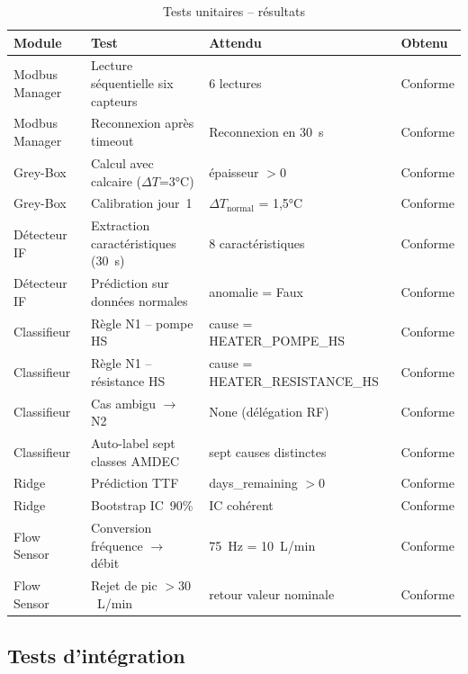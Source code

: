 \begin{table}[htbp]
\centering
\renewcommand{\arraystretch}{1.45}
\caption{Tests unitaires -- résultats}
\label{tab:tests_unitaires}
\begin{tabular}{|p{}|p{}|p{}|p{}|}
\hline
\rowcolor{gray!25}
\textbf{Module} & \textbf{Test} & \textbf{Attendu} & \textbf{Obtenu} \\
\hline
Modbus Manager & Lecture séquentielle six capteurs & 6 lectures & Conforme \\
\hline
Modbus Manager & Reconnexion après timeout & Reconnexion en 30~s & Conforme \\
\hline
Grey-Box & Calcul avec calcaire (\(\Delta T\)=3°C) & épaisseur \(> 0\) & Conforme \\
\hline
Grey-Box & Calibration jour~1 & \(\Delta T_{\text{normal}}\) = 1,5°C & Conforme \\
\hline
Détecteur IF & Extraction caractéristiques (30~s) & 8 caractéristiques & Conforme \\
\hline
Détecteur IF & Prédiction sur données normales & anomalie = Faux & Conforme \\
\hline
Classifieur & Règle N1 -- pompe HS & cause = HEATER\_\allowbreak POMPE\_\allowbreak HS & Conforme \\
\hline
Classifieur & Règle N1 -- résistance HS & cause = HEATER\_\allowbreak RESISTANCE\_\allowbreak HS & Conforme \\
\hline
Classifieur & Cas ambigu \(\rightarrow\) N2 & None (délégation RF) & Conforme \\
\hline
Classifieur & Auto-label sept classes AMDEC & sept causes distinctes & Conforme \\
\hline
Ridge & Prédiction TTF & days\_\allowbreak remaining \(>0\) & Conforme \\
\hline
Ridge & Bootstrap IC~90\% & IC cohérent & Conforme \\
\hline
Flow Sensor & Conversion fréquence \(\rightarrow\) débit & 75~Hz = 10~L/min & Conforme \\
\hline
Flow Sensor & Rejet de pic \(>30\)~L/min & retour valeur nominale & Conforme \\
\hline
\end{tabular}
\end{table}

\subsection{Tests d'intégration}

